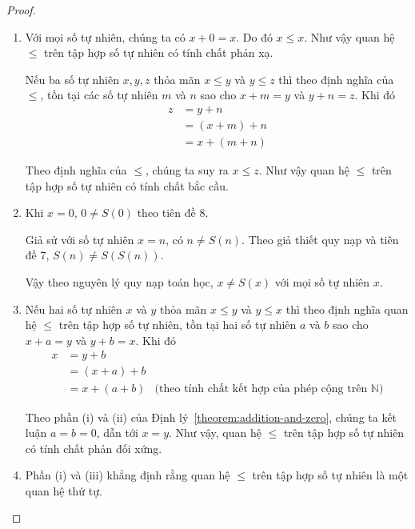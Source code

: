 \begin{proof}
    \begin{enumerate}[label={(\roman*)}]
        \item Với mọi số tự nhiên, chúng ta có $x + 0 = x$. Do đó $x\leq x$. Như vậy quan hệ $\leq$ trên tập hợp số tự nhiên có tính chất phản xạ.

              Nếu ba số tự nhiên $x, y, z$ thỏa mãn $x\leq y$ và $y\leq z$ thì theo định nghĩa của $\leq$, tồn tại các số tự nhiên $m$ và $n$ sao cho $x + m = y$ và $y + n = z$. Khi đó
              \begin{align*}
                  z & = y + n       \\
                    & = (x + m) + n \\
                    & = x + (m + n)
              \end{align*}

              Theo định nghĩa của $\leq$, chúng ta suy ra $x\leq z$. Như vậy quan hệ $\leq$ trên tập hợp số tự nhiên có tính chất bắc cầu.
        \item Khi $x = 0$, $0\ne S(0)$ theo tiên đề 8.

              Giả sử với số tự nhiên $x = n$, có $n\ne S(n)$. Theo giả thiết quy nạp và tiên đề 7, $S(n)\ne S(S(n))$.

              Vậy theo nguyên lý quy nạp toán học, $x\ne S(x)$ với mọi số tự nhiên $x$.
        \item Nếu hai số tự nhiên $x$ và $y$ thỏa mãn $x\leq y$ và $y\leq x$ thì theo định nghĩa quan hệ $\leq$ trên tập hợp số tự nhiên, tồn tại hai số tự nhiên $a$ và $b$ sao cho $x + a = y$ và $y + b = x$. Khi đó
              \begin{align*}
                  x & = y + b                                                                         \\
                    & = (x + a) + b                                                                   \\
                    & = x + (a + b) & \text{(theo tính chất kết hợp của phép cộng trên $\mathbb{N}$)}
              \end{align*}

              Theo phần (i) và (ii) của Định lý~\ref{theorem:addition-and-zero}, chúng ta kết luận $a = b = 0$, dẫn tới $x = y$. Như vậy, quan hệ $\leq$ trên tập hợp số tự nhiên có tính chất phản đối xứng.
        \item Phần (i) và (iii) khẳng định rằng quan hệ $\leq$ trên tập hợp số tự nhiên là một quan hệ thứ tự.


\end{enumerate}
\end{proof}
